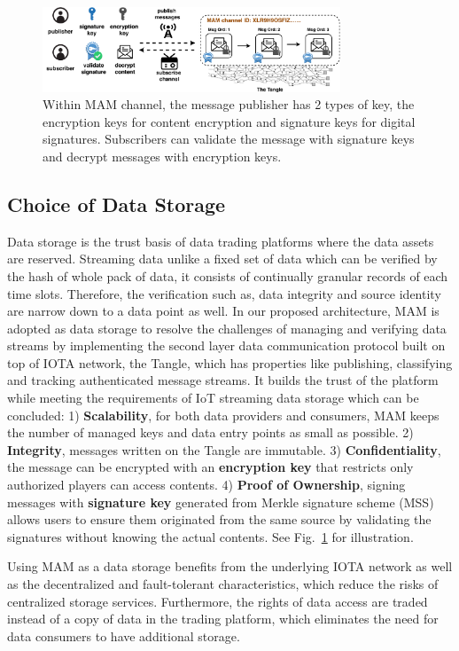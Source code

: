 \documentclass[conference]{IEEEtran}
\begin{document}
\begin{figure}[h]
    \centering
    \includegraphics[width=3.5in]{channel_and_key_fold}
    \caption{Within MAM channel, the message publisher has 2 types of key, the encryption keys for content encryption and signature keys for digital signatures. Subscribers can validate the message with signature keys and decrypt messages with encryption keys.}
    \label{fig:channel_and_key}
\end{figure}

\subsection{Choice of Data Storage}
Data storage is the trust basis of data trading platforms where the data assets are reserved. Streaming data unlike a fixed set of data which can be verified by the hash of whole pack of data, it consists of continually granular records of each time slots. Therefore, the verification such as, data integrity and source identity are narrow down to a data point as well. In our proposed architecture, MAM is adopted as data storage to resolve the challenges of managing and verifying data streams by implementing the second layer data communication protocol built on top of IOTA network, the Tangle, which has properties like publishing, classifying and tracking authenticated message streams. It builds the trust of the platform while meeting the requirements of IoT streaming data storage which can be concluded: 1) \textbf{Scalability}, for both data providers and consumers, MAM keeps the number of managed keys and data entry points as small as possible. 2) \textbf{Integrity}, messages written on the Tangle are immutable. 3) \textbf{Confidentiality}, the message can be encrypted with an \textbf{encryption key} that restricts only authorized players can access contents. 4) \textbf{Proof of Ownership}, signing messages with \textbf{signature key} generated from Merkle signature scheme\cite{MSS} (MSS) allows users to ensure them originated from the same source by validating the signatures without knowing the actual contents. See Fig.~\ref{fig:channel_and_key} for illustration.

Using MAM as a data storage benefits from the underlying IOTA network as well as the decentralized and fault-tolerant characteristics, which reduce the risks of centralized storage services. Furthermore, the rights of data access are traded instead of a copy of data in the trading platform, which eliminates the need for data consumers to have additional storage.
\end{document}
